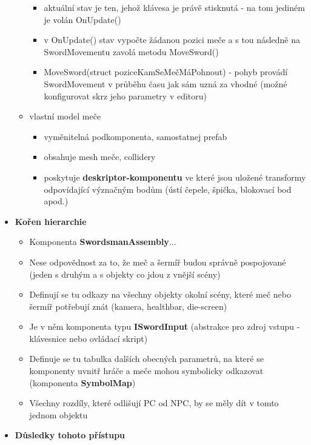 \begin{itemize}
\begin{itemize}
\begin{itemize}
                    \item aktuální stav je ten, jehož klávesa je právě stisknutá - na tom jediném je volán OnUpdate()
                    \item v OnUpdate() stav vypočte žádanou pozici meče a s tou následně na SwordMovementu zavolá metodu MoveSword()
                    \item MoveSword(struct poziceKamSeMečMáPohnout) - pohyb provádí SwordMovement v průběhu času jak sám uzná za vhodné (možné konfigurovat skrz jeho parametry v editoru)
                \end{itemize}
            \item vlastní model meče
                \begin{itemize}
                    \item vyměnitelná podkomponenta, samostatnej prefab
                    \item obsahuje mesh meče, collidery
                    \item poskytuje \textbf{deskriptor-komponentu} ve které jsou uložené transformy odpovídající význačným bodům (ústí čepele, špička, blokovací bod apod.)
                \end{itemize}
        \end{itemize} 
    \item \textbf{Kořen hierarchie} 
        \begin{itemize}
            \item Komponenta \textbf{SwordsmanAssembly}...
            \item Nese odpovědnost za to, že meč a šermíř budou správně pospojované (jeden s druhým a s objekty co jdou z vnější scény)
            \item Definují se tu odkazy na všechny objekty okolní scény, které meč nebo šermíř potřebují znát (kamera, healthbar, die-screen)
            \item Je v něm komponenta typu \textbf{ISwordInput} (abstrakce pro zdroj vstupu - klávesnice nebo ovládací skript)
            \item Definuje se tu tabulka dalších obecných parametrů, na které se komponenty uvnitř hráče a meče mohou symbolicky odkazovat (komponenta \textbf{SymbolMap})
            \item Všechny rozdíly, které odlišují \acs{PC} od \acs{NPC}, by se měly dít v tomto jednom objektu
        \end{itemize} 
    \item \textbf{Důsledky tohoto přístupu} 

\end{itemize}
